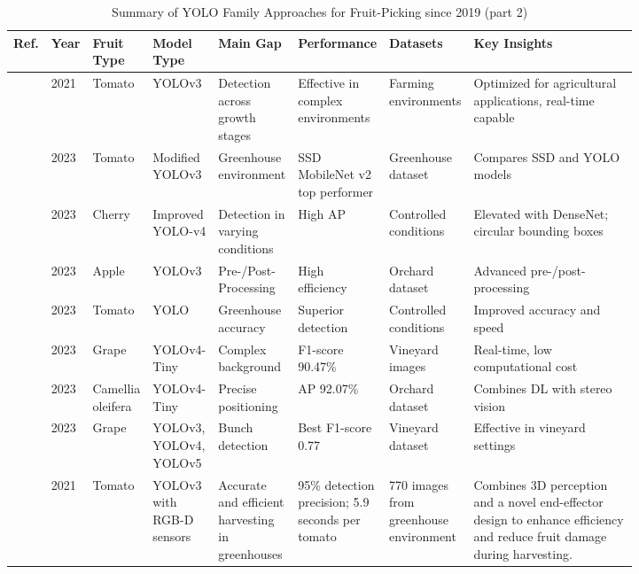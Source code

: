 \documentclass[a4paper,fleqn]{cas-dc}
\begin{document}
\iffalse
\begin{table}[H]
	\centering
	\footnotesize 
	\caption{Summary of YOLO Family Approaches for Fruit-Picking since 2019 (part 2)} 
	\label{tab:yolo-based} 
	\begin{tabular}{p{0.03\linewidth} p{0.03\linewidth} p{0.06\linewidth} p{0.06\linewidth} p{0.12\linewidth} p{0.12\linewidth} p{0.12\linewidth} p{0.28\linewidth}}
	\toprule
	\textbf{Ref.} & \textbf{Year} & \textbf{Fruit Type} & \textbf{Model Type} & \textbf{Main Gap} & \textbf{Performance} & \textbf{Datasets} & \textbf{Key Insights} \\ \midrule
\cite{liu2020yolo}  & 2021 & Tomato & YOLOv3 & Detection across growth stages & Effective in complex environments & Farming environments & Optimized for agricultural applications, real-time capable \\ \midrule
\cite{lawal2021tomato} & 2023 & Tomato & Modified YOLOv3 & Greenhouse environment & SSD MobileNet v2 top performer & Greenhouse dataset & Compares SSD and YOLO models \\ \midrule
\cite{gai2023detection} & 2023 & Cherry & Improved YOLO-v4 & Detection in varying conditions & High AP & Controlled conditions & Elevated with DenseNet; circular bounding boxes \\ \midrule
\cite{kuznetsova2020using} & 2023 & Apple & YOLOv3 & Pre-/Post-Processing & High efficiency & Orchard dataset & Advanced pre-/post-processing \\ \midrule
\cite{magalhaes2021evaluating} & 2023 & Tomato & YOLO & Greenhouse accuracy & Superior detection & Controlled conditions & Improved accuracy and speed \\ \midrule
\cite{li2021real} & 2023 & Grape & YOLOv4-Tiny & Complex background & F1-score 90.47\% & Vineyard images & Real-time, low computational cost \\ \midrule
\cite{tang2023fruit} & 2023 & Camellia oleifera & YOLOv4-Tiny & Precise positioning & AP 92.07\% & Orchard dataset & Combines DL with stereo vision \\ \midrule
\cite{sozzi2022automatic} & 2023 & Grape & YOLOv3, YOLOv4, YOLOv5 & Bunch detection & Best F1-score 0.77 & Vineyard dataset & Effective in vineyard settings \\ \midrule
\cite{jun2021towards} & 2021 & Tomato & YOLOv3 with RGB-D sensors & Accurate and efficient harvesting in greenhouses & 95\% detection precision; 5.9 seconds per tomato & 770 images from greenhouse environment & Combines 3D perception and a novel end-effector design to enhance efficiency and reduce fruit damage during harvesting. \\ \midrule

\end{tabular}
\end{table}
\end{document}
